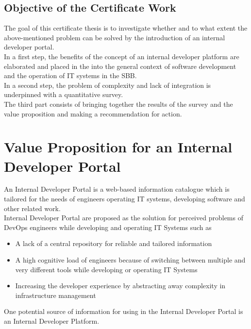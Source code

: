 \documentclass[a4paper,12pt]{article}
\begin{document}
    \subsection{Objective of the Certificate Work}
    \label{subsec:iobjective}
    The goal of this certificate thesis is to investigate whether and to what extent the above-mentioned problem
    can be solved by the introduction of an internal developer portal.\\
    In a first step, the benefits of the concept of an internal developer platform are elaborated and placed in the
    into the general context of software development and the operation of IT systems in the SBB.\\
    In a second step, the problem of complexity and lack of integration is underpinned with a quantitative survey.\\
    The third part consists of bringing together the results of the survey and the value proposition and making a
    recommendation for action.


    \section{Value Proposition for an Internal Developer Portal}
    \label{sec:vp}
    An Internal Developer Portal is a web-based information catalogue which is tailored for the needs of
    engineers operating IT systems, developing software and other related work.\\
    Internal Developer Portal are proposed as the solution for perceived problems\parencite{backstagestory} of DevOps
    engineers while developing and operating IT Systems such as
    \begin{itemize}
        \item A lack of a central repository for reliable and tailored information
        \item A high cognitive load of engineers because of switching between multiple and very different tools while developing or operating IT Systems
        \item Increasing the developer experience by abstracting away complexity in infrastructure management
    \end{itemize}
    One potential source of information for using in the Internal Developer Portal is an Internal Developer Platform.
\end{document}
